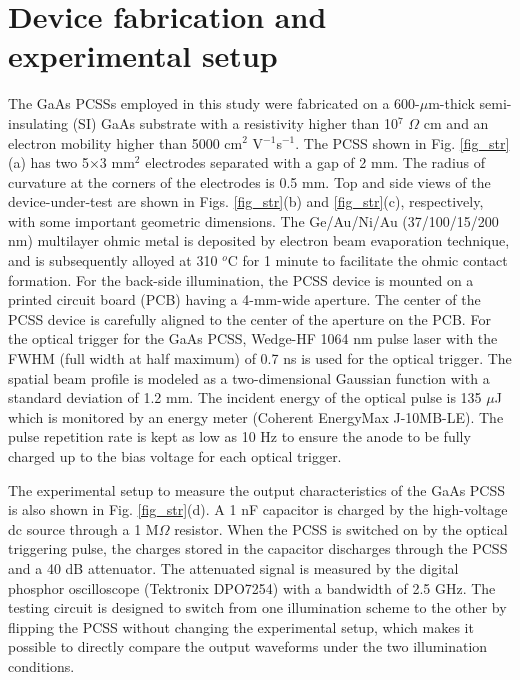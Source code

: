 \documentclass[final,5p,times,twocolumn]{elsarticle}
\newcommand{\revision}[1]{{#1}}
\begin{document}
\section{Device fabrication and experimental setup}

   The GaAs PCSSs employed in this study were fabricated on a 600-$\mu$m-thick semi-insulating (SI) GaAs substrate with a resistivity higher than 10$^7$ $\Omega$ cm and an electron mobility higher than 5000 cm$^2$ V$^{-1}$s$^{-1}$. 
\revision{The PCSS shown in Fig. \ref{fig_str}(a) has two 5$\times$3 mm$^2$ electrodes separated with a gap of 2 mm.
The radius of curvature at the corners of the electrodes is 0.5 mm.
Top and side views of the device-under-test are shown in Figs. \ref{fig_str}(b) and \ref{fig_str}(c), respectively, with some important geometric dimensions.
}
   The Ge/Au/Ni/Au (37/100/15/200 nm) multilayer ohmic metal is deposited by electron beam evaporation technique, and is subsequently alloyed at 310 $^o$C for 1 minute to facilitate the ohmic contact formation. 
   For the back-side illumination, the PCSS device is mounted on a printed circuit board (PCB) having a 4-mm-wide aperture.
   The center of the PCSS device is carefully aligned to the center of the aperture on the PCB.
   For the optical trigger for the GaAs PCSS, Wedge-HF 1064 nm pulse laser with the FWHM (full width at half maximum) of 0.7 ns is used for the optical trigger. 
   The spatial beam profile is modeled as a two-dimensional Gaussian function with a standard deviation of 1.2 mm.
   The incident energy of the optical pulse is 135 $\mu$J which is monitored by an energy meter (Coherent EnergyMax J-10MB-LE).
   The pulse repetition rate is kept as low as 10 Hz to ensure the anode to be fully charged up to the bias voltage for each optical trigger.

   The experimental setup to measure the output characteristics of the GaAs PCSS is also shown \revision{in Fig. \ref{fig_str}(d).} 
   A 1 nF capacitor is charged by the high-voltage dc source through a 1 M$\Omega$ resistor. 
   When the PCSS is switched on by the optical triggering pulse, the charges stored in the capacitor discharges through the PCSS and a 40 dB attenuator. 
   The attenuated signal is measured by the digital phosphor oscilloscope (Tektronix DPO7254) with a bandwidth of 2.5 GHz.
   The testing circuit is designed to switch from one illumination scheme to the other by flipping the PCSS without changing the experimental setup, which makes it possible to directly compare the output waveforms under the two illumination conditions.
\end{document}
